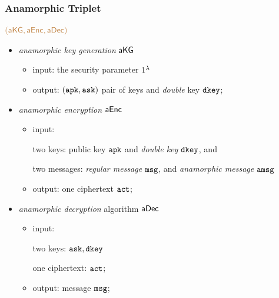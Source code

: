 \documentclass[]{beamer}
\begin{document}
\begin{frame}
\frametitle{Anamorphic Triplet}

$\color{brown} ({\mathsf{a}}{\mathsf{KG}},{\mathsf{a}}{\mathsf{Enc}},{\mathsf{a}}{\mathsf{Dec}})$

\begin{itemize}
    \item {\color{blue} {\em anamorphic key generation} ${\mathsf{a}}{\mathsf{KG}}$ }
        \begin{itemize}
            \item input: the security parameter $1^\lambda$
            \item output: $({\mathtt{a}}{\mathtt{pk}},{\mathtt{a}}{\mathtt{sk}})$ pair of keys and
            {\color{purple} {\em double} key ${\mathtt{dkey}}$};
        \end{itemize}
\vfill
\item 
{\color{blue} {\em anamorphic encryption} ${\mathsf{a}}{\mathsf{Enc}}$}
        \begin{itemize}
            \item input:

            {\color{teal} two keys:}
        public key ${\mathtt{a}}{\mathtt{pk}}$ and {\color{purple} {\em double key} ${\mathtt{dkey}}$}, and

            {\color{teal} two messages:} {\em regular message} ${\mathtt{msg}}$, and
            {\color{purple} {\em anamorphic message} ${\mathtt{a}}{\mathtt{msg}}$}

            \item output: {\color{teal} one ciphertext} ${\mathtt{a}}{\mathtt{ct}}$;
        \end{itemize}
\vfill
\item 
{\color{blue} {\em anamorphic decryption} algorithm ${\mathsf{a}}{\mathsf{Dec}}$}
        \begin{itemize}
            \item input: 

            {\color{teal} two keys:} ${\mathtt{a}}{\mathtt{sk}},{\mathtt{dkey}}$ 

            {\color{teal} one ciphertext:} ${\mathtt{a}}{\mathtt{ct}}$;
         \item output: message ${\mathtt{msg}}$;
        \end{itemize}
\end{itemize}
\end{frame}
\end{document}
